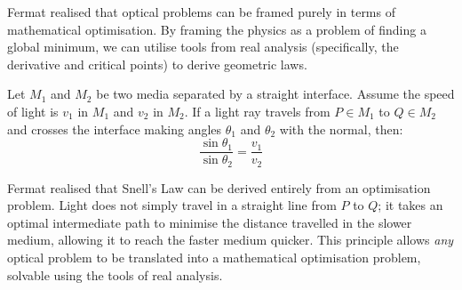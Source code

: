 \documentclass[../analysis1.tex]{subfiles}
\begin{document}
\begin{remark}
    Fermat realised that optical problems can be framed purely in terms of mathematical optimisation. By framing the physics as a problem of finding a global minimum, we can utilise tools from real analysis (specifically, the derivative and critical points) to derive geometric laws.
\end{remark}

\begin{theorem}
    \begin{shaded*}
        Let $M_1$ and $M_2$ be two media separated by a straight interface. Assume the speed of light is $v_1$ in $M_1$ and $v_2$ in $M_2$. If a light ray travels from $P \in M_1$ to $Q \in M_2$ and crosses the interface making angles $\theta_1$ and $\theta_2$ with the normal, then:
        $$ \frac{\sin \theta_1}{\sin \theta_2} = \frac{v_1}{v_2} $$
    \end{shaded*}
\end{theorem}

\begin{remark}
    Fermat realised that Snell's Law can be derived entirely from an optimisation problem. Light does not simply travel in a straight line from $P$ to $Q$; it takes an optimal intermediate path to minimise the distance travelled in the slower medium, allowing it to reach the faster medium quicker. This principle allows \textit{any} optical problem to be translated into a mathematical optimisation problem, solvable using the tools of real analysis.
\end{remark}

\begin{center}
\end{center}
\end{document}
